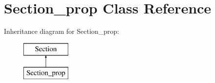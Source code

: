 \hypertarget{classSection__prop}{\section{Section\-\_\-prop Class Reference}
\label{classSection__prop}
}
Inheritance diagram for Section\-\_\-prop\-:\begin{figure}[H]
\begin{center}
\leavevmode
\includegraphics[height=2.000000cm]{classSection__prop}
\end{center}
\end{figure}
